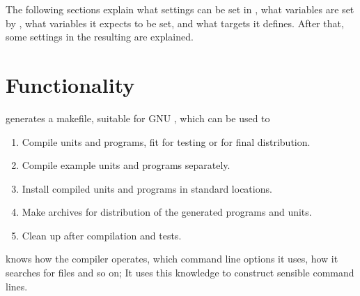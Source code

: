 The following sections explain what settings can be set in ,
what variables are set by , what variables it expects to be set,
and what targets it defines. After that, some settings in the resulting
 are explained.

\section{Functionality}
\label{se:fpcmakefunctionality}
 generates a makefile, suitable for GNU , 
which can be used to 
\begin{enumerate}
\item Compile units and programs, fit for testing or for final distribution.
\item Compile example units and programs separately.
\item Install compiled units and programs in standard locations.
\item Make archives for distribution of the generated programs and units.
\item Clean up after compilation and tests.
\end{enumerate}
 knows how the \fpc compiler operates, which command line
options it uses, how it searches for files and so on; It uses this knowledge
to construct sensible command lines. 

